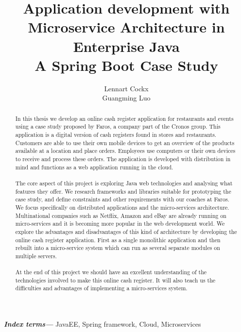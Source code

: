 \documentclass[12pt]{article}
\title{Application development with\\ Microservice Architecture in Enterprise Java\\ A Spring Boot Case Study}
\author{Lennart Cockx\\Guangming Luo}
\providecommand{\keywords}[1]{\textbf{\textit{Index terms---}} #1}
\begin{document}
\maketitle
\newpage
\tableofcontents
\newpage

\begin{abstract}
\noindent In this thesis we develop an online cash register application for restaurants and events using a case study proposed by Faros, a company part of the Cronos group. This application is a digital version of cash registers found in stores and restaurants. Customers are able to use their own mobile devices to get an overview of the products available at a location and place orders. Employees  use computers or their own devices to receive and process these orders. The application is developed with distribution in mind and functions as a web application running in the cloud. 
\\\\
The core aspect of this project is exploring Java web technologies and analysing what features they offer. We research frameworks and libraries suitable for prototyping the case study, and define constraints and other requirements with our coaches at Faros. We focus specifically on distributed applications and the micro-services architecture. Multinational companies such as Netflix, Amazon and eBay are already running on micro-services and it is becoming more popular in the web development world. We explore the advantages and disadvantages of this kind of architecture by developing the online cash register application. First as a single monolithic application and then rebuilt into a micro-service system which can run as several separate modules on multiple servers.
\\\\
At the end of this project we should have an excellent understanding of the technologies involved to make this online cash register. It will also teach us the difficulties and advantages of implementing a micro-services system. 
\end{abstract}
\keywords{JavaEE, Spring framework, Cloud, Microservices}


\end{document}
